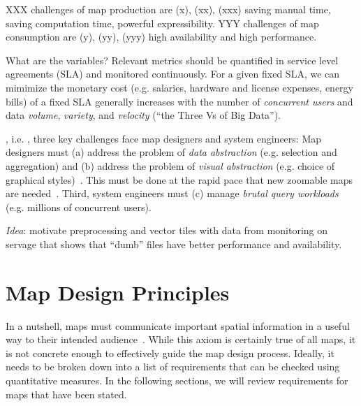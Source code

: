 \documentclass[11pt, oneside]{report}   	%
\begin{document}
XXX challenges of map production are (x), (xx), (xxx) saving manual time, saving computation time, powerful expressibility. YYY challenges of map consumption are (y), (yy), (yyy) high availability and high performance.

What are the variables? Relevant metrics should be quantified in service level agreements (SLA) and monitored continuously. For a given fixed SLA, we can mimimize the monetary cost (e.g. salaries, hardware and license expenses, energy bills) of a fixed SLA generally increases with the number of \emph{concurrent users} and data \emph{volume}, \emph{variety}, and \emph{velocity} (``the Three Vs of Big Data'').



, i.e. , three key challenges face map designers and system engineers: Map designers must (a) address the problem of \emph{data abstraction} (e.g. selection and aggregation) and (b) address the problem of  \emph{visual abstraction} (e.g. choice of graphical styles)~\cite{stolte2003multiscale}. This must be done at the rapid pace that new zoomable maps are needed~\cite{lomet2012warstories}. Third, system engineers must (c) manage \emph{brutal query workloads} (e.g. millions of concurrent users).

\emph{Idea}: motivate preprocessing and vector tiles with data from monitoring on servage that shows that ``dumb'' files have better performance and availability.


\section{Map Design Principles}
In a nutshell, maps must communicate important spatial information in a useful way to their intended audience~\cite{robinson1982early}. While this axiom is certainly true of all maps, it is not concrete enough to effectively guide the map design process. Ideally, it needs to be broken down into a list of requirements that can be checked using quantitative measures. In the following sections, we will review requirements for maps that have been stated.
\end{document}
